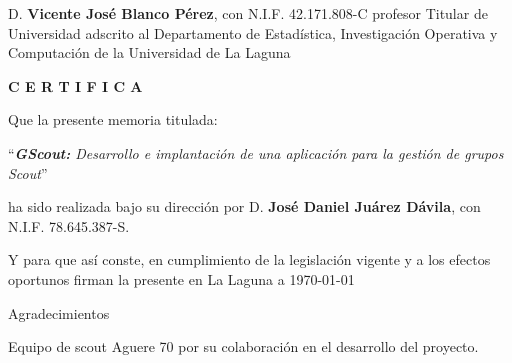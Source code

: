 \documentclass[spanish,a4paper,11pt,twoside]{report}
\begin{document}
D. {\bf Vicente José Blanco Pérez}, con N.I.F. 42.171.808-C 
profesor
Titular de Universidad 
adscrito al Departamento 
de Estadística, Investigación Operativa y Computación
de la Universidad de La Laguna

\bigskip
\bigskip
\bigskip
\bigskip
\bigskip
{\bf C E R T I F I C A}

\bigskip
\bigskip
\bigskip
Que la presente memoria titulada:

\bigskip
``{\it \textbf{GScout:} Desarrollo e implantación de una 
        aplicación para la gestión de grupos Scout}''

\bigskip
\bigskip
\bigskip

\noindent ha sido realizada bajo su dirección por D. {\bf José Daniel Juárez Dávila},
con N.I.F. 78.645.387-S.

\bigskip
\bigskip

Y para que así conste, en cumplimiento de la legislación vigente y a los efectos
oportunos firman la presente en La Laguna a \today 

\cleardoublepage
\thispagestyle{empty}

{ \flushright

\begin{LARGE}
Agradecimientos
\end{LARGE}

\hspace{3mm}

\begin{large}


\hspace{3mm}
Equipo de scout Aguere 70 por su colaboración en el  desarrollo del proyecto.

\end{large}

}
\end{document}
